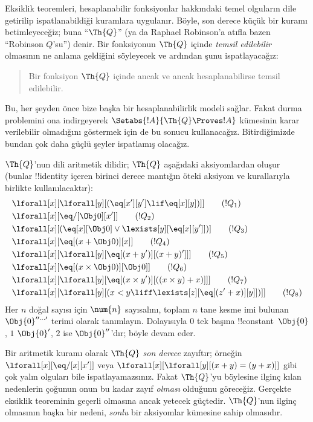 \documentclass[../../../include/open-logic-section]{subfiles}
\begin{document}

Eksiklik teoremleri, hesaplanabilir fonksiyonlar hakkındaki temel olguların
dile getirilip ispatlanabildiği kuramlara uygulanır. Böyle, son derece küçük
bir kuramı betimleyeceğiz; buna ``$\Th{Q}$'' (ya da Raphael Robinson'a
atıfla bazen ``Robinson $Q$'su'') denir. Bir fonksiyonun $\Th{Q}$ içinde
\emph{temsil edilebilir} olmasının ne anlama geldiğini söyleyecek ve ardından
şunu ispatlayacağız:
\begin{quote}
  Bir fonksiyon $\Th{Q}$ içinde ancak ve ancak hesaplanabilirse temsil
  edilebilir.
\end{quote}
Bu, her şeyden önce bize başka bir hesaplanabilirlik modeli sağlar. Fakat
durma problemini ona indirgeyerek $\Setabs{!A}{\Th{Q} \Proves !A}$ kümesinin
karar verilebilir olmadığını göstermek için de bu sonucu kullanacağız.
Bitirdiğimizde bundan çok daha güçlü şeyler ispatlamış olacağız.

$\Th{Q}$'nun dili aritmetik dilidir; $\Th{Q}$ aşağıdaki aksiyomlardan oluşur
(bunlar !!{identity} içeren birinci derece mantığın öteki aksiyom ve
kurallarıyla birlikte kullanılacaktır):
\begin{align*}
& \lforall[x][\lforall[y][(\eq[x'][y'] \lif \eq[x][y])]] \tag{$!Q_1$}\\
& \lforall[x][\eq/[\Obj 0][x']] \tag{$!Q_2$}\\
& \lforall[x][(\eq[x][\Obj 0] \lor \lexists[y][\eq[x][y']])] \tag{$!Q_3$}\\
& \lforall[x][\eq[(x + \Obj 0)][x]] \tag{$!Q_4$}\\
& \lforall[x][\lforall[y][\eq[(x + y')][(x + y)']]] \tag{$!Q_5$}\\
& \lforall[x][\eq[(x \times \Obj 0)][\Obj 0]] \tag{$!Q_6$}\\
& \lforall[x][\lforall[y][\eq[(x \times y')][((x \times y) + x)]]] \tag{$!Q_7$}\\
& \lforall[x][\lforall[y][(x < y \liff \lexists[z][\eq[(z' + x)][y]])]] \tag{$!Q_8$}
\end{align*}
Her $n$ doğal sayısı için $\num{n}$ sayısalını, toplam $n$ tane kesme imi
bulunan $\Obj{0}^{\prime\prime\ldots\prime}$ terimi olarak tanımlayın.
Dolayısıyla $\num{0}$ tek başına !!{constant}~$\Obj{0}$, $\num{1}$
$\Obj{0}'$, $\num{2}$ ise $\Obj{0}''$'dır; böyle devam eder.

Bir aritmetik kuramı olarak $\Th{Q}$ \emph{son derece} zayıftır; örneğin
$\lforall[x][\eq/[x][x']]$ veya $\lforall[x][\lforall[y][(x + y) = (y +
    x)]]$ gibi çok yalın olguları bile ispatlayamazsınız. Fakat
$\Th{Q}$'yu böylesine ilginç kılan nedenlerin çoğunun onun bu kadar zayıf
\emph{olması} olduğunu göreceğiz. Gerçekte eksiklik teoreminin geçerli
olmasına ancak yetecek güçtedir. $\Th{Q}$'nun ilginç olmasının başka bir
nedeni, \emph{sonlu} bir aksiyomlar kümesine sahip olmasıdır.
\end{document}
